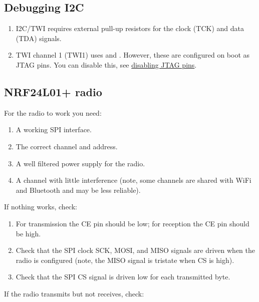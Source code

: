 \subsection{Debugging I2C}
\label{debugging-i2c}

\begin{enumerate}
\item
  I2C/TWI requires external pull-up resistors for the clock (TCK) and
  data (TDA) signals.
\item
  TWI channel 1 (TWI1) uses  and . However, these are configured
  on boot as JTAG pins. You can disable this, see
  \hyperref[disabling-jtag-pins]{disabling JTAG pins}.
\end{enumerate}



\subsection{NRF24L01+ radio}
\label{nrf24l01-radio}

For the radio to work you need:

\begin{enumerate}
\item
  A working SPI interface.
\item
  The correct channel and address.
\item
  A well filtered power supply for the radio.
\item
  A channel with little interference (note, some channels are shared
  with WiFi and Bluetooth and may be less reliable).
\end{enumerate}

If nothing works, check:

\begin{enumerate}
\item
  For transmission the CE pin should be low; for reception the CE pin
  should be high.
\item
  Check that the SPI clock SCK, MOSI, and MISO signals are driven when
  the radio is configured (note, the MISO signal is tristate when CS is
  high).
\item
  Check that the SPI CS signal is driven low for each transmitted byte.
\end{enumerate}

If the radio transmits but not receives, check:

